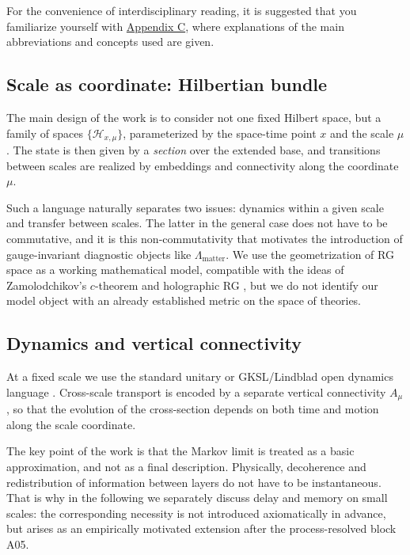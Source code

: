 \documentclass[11pt,a4paper]{article}
\theoremstyle{definition}
\theoremstyle{plain}
\theoremstyle{remark}
\begin{document}
For the convenience of interdisciplinary reading, it is suggested that you familiarize yourself with \hyperref[sec:appendix:glossary]{Appendix C}, where explanations of the main abbreviations and concepts used are given.

\subsection{Scale as coordinate: Hilbertian bundle}

The main design of the work is to consider not one fixed Hilbert space, but a family of spaces
$\{\mathcal H_{x,\mu}\}$, parameterized by the space-time point $x$ and the scale $\mu$.
The state is then given by a \emph{section} over the extended base, and transitions between scales are realized by embeddings and connectivity along the coordinate $\mu$.

Such a language naturally separates two issues: dynamics within a given scale and transfer between scales.
The latter in the general case does not have to be commutative, and it is this non-commutativity that motivates the introduction of gauge-invariant diagnostic objects like $\Lambda_{\mathrm{matter}}$.
We use the geometrization of RG space as a working mathematical model, compatible with the ideas of Zamolodchikov’s $c$-theorem and holographic RG \cite{Zamolodchikov1986Irreversibility,deBoerVerlindeVerlinde2000HolographicRG,RandallSundrum1999LargeHierarchy,RandallSundrum1999Alternative}, but we do not identify our model object with an already established metric on the space of theories.

\subsection{Dynamics and vertical connectivity}

At a fixed scale we use the standard unitary or GKSL/Lindblad open dynamics language \cite{GoriniKossakowskiSudarshan1976GKSL,Lindblad1976Generators,Kraus1983StatesEffectsOperations,Stinespring1955PositiveFunctions,NielsenChuang2000QCQI,BreuerPetruccione2002OpenQuantum}. Cross-scale transport is encoded by a separate vertical connectivity $A_\mu$, so that the evolution of the cross-section depends on both time and motion along the scale coordinate.

The key point of the work is that the Markov limit is treated as a basic approximation, and not as a final description. Physically, decoherence and redistribution of information between layers do not have to be instantaneous. That is why in the following we separately discuss delay and memory on small scales: the corresponding necessity is not introduced axiomatically in advance, but arises as an empirically motivated extension after the process-resolved block A05.
\end{document}
